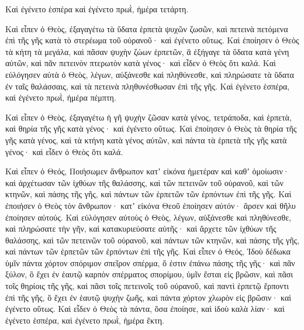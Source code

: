{Καὶ ἐγένετο ἑσπέρα καὶ ἐγένετο πρωῒ, ἡμέρα τετάρτη.
\par }{\PP {}Καὶ εἶπεν ὁ Θεὸς, ἐξαγαγέτω τὰ ὕδατα ἑρπετὰ ψυχῶν ζωσῶν, καὶ πετεινὰ πετόμενα ἐπὶ τῆς γῆς κατὰ τὸ στερέωμα τοῦ οὐρανοῦ· καὶ ἐγένετο οὕτως.
Καὶ ἐποίησεν ὁ Θεὸς τὰ κήτη τὰ μεγάλα, καὶ πᾶσαν ψυχὴν ζώων ἑρπετῶν, ἃ ἐξήγαγε τὰ ὕδατα κατὰ γένη αὐτῶν, καὶ πᾶν πετεινὸν πτερωτὸν κατὰ γένος· καὶ εἶδεν ὁ Θεὸς ὅτι καλά.
Καὶ εὐλόγησεν αὐτὰ ὁ Θεὸς, λέγων, αὐξάνεσθε καὶ πληθύνεσθε, καὶ πληρώσατε τὰ ὕδατα ἐν ταῖς θαλάσσαις, καὶ τὰ πετεινὰ πληθυνέσθωσαν ἐπὶ τῆς γῆς.
Καὶ ἐγένετο ἑσπέρα, καὶ ἐγένετο πρωῒ, ἡμέρα πέμπτη.
\par }{\PP {}Καὶ εἶπεν ὁ Θεὸς, ἐξαγαγέτω ἡ γῆ ψυχὴν ζῶσαν κατὰ γένος, τετράποδα, καὶ ἑρπετὰ, καὶ θηρία τῆς γῆς κατὰ γένος· καὶ ἐγένετο οὕτως.
Καὶ ἐποίησεν ὁ Θεὸς τὰ θηρία τῆς γῆς κατὰ γένος, καὶ τὰ κτήνη κατὰ γένος αὐτῶν, καὶ πάντα τὰ ἑρπετὰ τῆς γῆς κατὰ γένος· καὶ εἶδεν ὁ Θεὸς ὅτι καλά.
\par }{\PP {}Καὶ εἶπεν ὁ Θεός, Ποιήσωμεν ἄνθρωπον κατʼ εἰκόνα ἡμετέραν καὶ καθʼ ὁμοίωσιν· καὶ ἀρχέτωσαν τῶν ἰχθύων τῆς θαλάσσης, καὶ τῶν πετεινῶν τοῦ οὐρανοῦ, καὶ τῶν κτηνῶν, καὶ πάσης τῆς γῆς, καὶ πάντων τῶν ἑρπετῶν τῶν ἑρπόντων ἐπὶ τῆς γῆς.
Καὶ ἐποιήσεν ὁ Θεὸς τὸν ἄνθρωπον· κατʼ εἰκόνα Θεοῦ ἐποίησεν αὐτόν· ἄρσεν καὶ θῆλυ ἐποίησεν αὐτούς.
Καὶ εὐλόγησεν αὐτοὺς ὁ Θεὸς, λέγων, αὐξάνεσθε καὶ πληθύνεσθε, καὶ πληρώσατε τὴν γῆν, καὶ κατακυριεύσατε αὐτῆς· καὶ ἄρχετε τῶν ἰχθύων τῆς θαλάσσης, καὶ τῶν πετεινῶν τοῦ οὐρανοῦ, καὶ πάντων τῶν κτηνῶν, καὶ πάσης τῆς γῆς, καὶ πάντων τῶν ἑρπετῶν τῶν ἑρπόντων ἐπὶ τῆς γῆς.
Καὶ εἶπεν ὁ Θεός, Ἰδοὺ δέδωκα ὑμῖν πάντα χόρτον σπόριμον σπεῖρον σπέρμα, ὅ ἐστιν ἐπάνω πάσης τῆς γῆς· καὶ πᾶν ξύλον, ὃ ἔχει ἐν ἑαυτῷ καρπὸν σπέρματος σπορίμου, ὑμῖν ἔσται εἰς βρῶσιν,
καὶ πᾶσι τοῖς θηρίοις τῆς γῆς, καὶ πᾶσι τοῖς πετεινοῖς τοῦ οὐρανοῦ, καὶ παντὶ ἑρπετῷ ἕρποντι ἐπὶ τῆς γῆς, ὃ ἔχει ἐν ἑαυτῷ ψυχὴν ζωῆς, καὶ πάντα χόρτον χλωρὸν εἰς βρῶσιν· καὶ ἐγένετο οὕτως.
Καὶ εἶδεν ὁ Θεὸς τὰ πάντα, ὅσα ἐποίησε, καὶ ἰδοὺ καλὰ λίαν· καὶ ἐγένετο ἑσπέρα, καὶ ἐγένετο πρωῒ, ἡμέρα ἕκτη.

}
